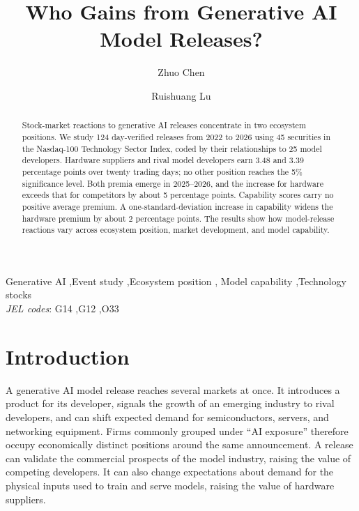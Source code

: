 \documentclass[review,12pt,authoryear]{elsarticle}
\begin{document}
\begin{frontmatter}

\title{Who Gains from Generative AI Model Releases?}

\author[sdu]{Zhuo Chen}
\author[sdu]{Ruishuang Lu}

\begin{abstract}
Stock-market reactions to generative AI releases concentrate in two
ecosystem positions. We study 124 day-verified releases from 2022 to 2026
using 45 securities in the Nasdaq-100 Technology Sector Index, coded by
their relationships to 25 model developers. Hardware suppliers and rival
model developers earn 3.48 and 3.39 percentage points over twenty trading
days; no other position reaches the 5\% significance level. Both premia
emerge in 2025--2026, and the increase for hardware exceeds that for
competitors by about 5 percentage points. Capability scores carry no
positive average premium. A one-standard-deviation increase in capability
widens the hardware premium by about 2 percentage points. The results show
how model-release reactions vary across ecosystem position, market
development, and model capability.
\end{abstract}

\begin{keyword}
Generative AI \sep Event study \sep Ecosystem position \sep
Model capability \sep Technology stocks
\\ \textit{JEL codes}: G14 \sep G12 \sep O33
\end{keyword}

\end{frontmatter}

\section{Introduction}

A generative AI model release reaches several markets at once. It introduces
a product for its developer, signals the growth of an emerging industry to
rival developers, and can shift expected demand for semiconductors, servers,
and networking equipment. Firms commonly grouped under ``AI exposure''
therefore occupy economically distinct positions around the same
announcement. A release can validate the commercial prospects of the model
industry, raising the value of competing developers. It can also change
expectations about demand for the physical inputs used to train and serve
models, raising the value of hardware suppliers.
\end{document}
